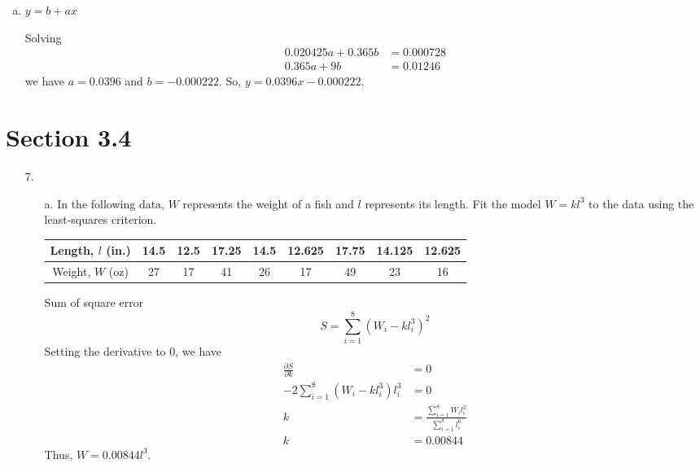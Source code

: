 \documentclass[10pt]{report}
\begin{document}
\begin{enumerate}
\begin{enumerate}[a.]
		\item 
		$y=b+ax$
		
		Solving
		\begin{align*}
			0.020425a + 0.365b &= 0.000728\\
			0.365a + 9b &= 0.01246
		\end{align*}
		we have $a=0.0396$ and $b=-0.000222$. So, $y=0.0396x - 0.000222$.
	\end{enumerate}
\end{enumerate}

\section*{Section 3.4}
\begin{enumerate}
	\item [7.]
	\begin{enumerate}
		\item [a.]
		In the following data, $W$ represents the weight of a fish and $l$ represents its length. Fit the model $W=kl^3$ to the data using the least-squares criterion.
		\begin{table}[H]
			\centering
			\begin{tabular}{*{9}{c}} 
				\toprule
				Length, $l$ (in.) & 14.5 & 12.5 & 17.25 & 14.5 & 12.625 & 17.75 & 14.125 & 12.625 \\ \midrule
				Weight, $W$ (oz) & 27 & 17 & 41 & 26 & 17 & 49 & 23 & 16  \\
				\bottomrule
			\end{tabular}
		\end{table}
		Sum of square error
		\[
		S = \sum_{i=1}^{8} (W_i - kl_i^3)^2
		\]
		Setting the derivative to 0, we have
		\begin{align*}
			\frac{\partial S}{\partial k} &= 0\\
			-2 \sum_{i=1}^{8} (W_i - kl_i^3)l_i^3 &= 0\\
			k &= \frac{\sum_{i=1}^{8} W_i l_i^3}{\sum_{i=1}^{8} l_i^6}\\
			k &= 0.00844
		\end{align*}
		Thus, $W=0.00844l^3$.
		

\end{enumerate}
\end{enumerate}
\end{document}
